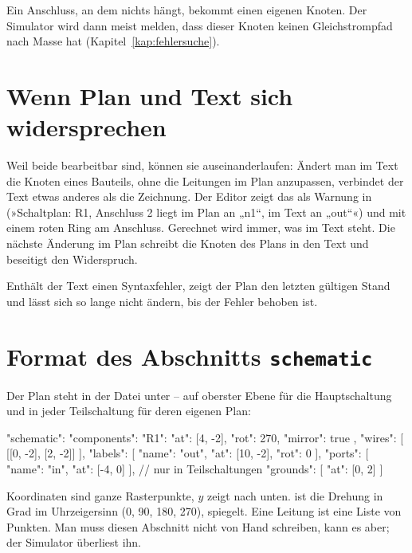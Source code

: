 Ein Anschluss, an dem nichts hängt, bekommt einen eigenen Knoten. Der
Simulator wird dann meist melden, dass dieser Knoten keinen Gleichstrompfad
nach Masse hat (Kapitel~\ref{kap:fehlersuche}).

\section{Wenn Plan und Text sich widersprechen}

Weil beide bearbeitbar sind, können sie auseinanderlaufen: Ändert man im
Text die Knoten eines Bauteils, ohne die Leitungen im Plan anzupassen,
verbindet der Text etwas anderes als die Zeichnung. Der Editor zeigt das als
Warnung in  (»Schaltplan: R1, Anschluss 2 liegt im Plan an
„n1“, im Text an „out“«) und mit einem roten Ring am Anschluss. Gerechnet
wird immer, was im Text steht. Die nächste Änderung im Plan schreibt die
Knoten des Plans in den Text und beseitigt den Widerspruch.

Enthält der Text einen Syntaxfehler, zeigt der Plan den letzten gültigen
Stand und lässt sich so lange nicht ändern, bis der Fehler behoben ist.

\section{Format des Abschnitts \texttt{schematic}}

Der Plan steht in der Datei unter  – auf oberster Ebene
für die Hauptschaltung und in jeder Teilschaltung für deren eigenen Plan:

\begin{json}
"schematic": {
  "components": { "R1": { "at": [4, -2], "rot": 270, "mirror": true } },
  "wires":   [ [[0, -2], [2, -2]] ],
  "labels":  [ { "name": "out", "at": [10, -2], "rot": 0 } ],
  "ports":   [ { "name": "in", "at": [-4, 0] } ],      // nur in Teilschaltungen
  "grounds": [ { "at": [0, 2] } ]
}
\end{json}

Koordinaten sind ganze Rasterpunkte, $y$ zeigt nach unten.  ist
die Drehung in Grad im Uhrzeigersinn (0, 90, 180, 270), 
spiegelt. Eine Leitung ist eine Liste von Punkten. Man muss diesen Abschnitt
nicht von Hand schreiben, kann es aber; der Simulator überliest ihn.
